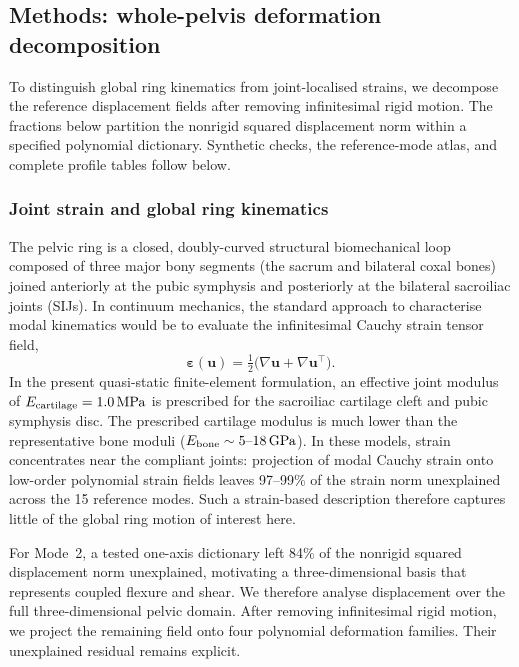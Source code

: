 \documentclass[pdflatex,sn-basic]{sn-jnl}
\begin{document}
\subsection{Methods: whole-pelvis deformation decomposition}\label{sec:mechanisms-methods}
To distinguish global ring kinematics from joint-localised strains, we decompose the reference displacement fields after removing infinitesimal rigid motion. The fractions below partition the nonrigid squared displacement norm within a specified polynomial dictionary. Synthetic checks, the reference-mode atlas, and complete profile tables follow below.

\subsubsection{Joint strain and global ring kinematics}
The pelvic ring is a closed, doubly-curved structural biomechanical loop composed of three major bony segments (the sacrum and bilateral coxal bones) joined anteriorly at the pubic symphysis and posteriorly at the bilateral sacroiliac joints (SIJs).
In continuum mechanics, the standard approach to characterise modal kinematics would be to evaluate the infinitesimal Cauchy strain tensor field,
\begin{equation}
\boldsymbol\varepsilon(\mathbf u) = \tfrac{1}{2}\big(\nabla \mathbf u + \nabla \mathbf u^\top\big).
\label{eq:cauchy-strain}
\end{equation}
In the present quasi-static finite-element formulation, an effective joint modulus of $E_{\rm cartilage} = 1.0\,\mathrm{MPa}$ is prescribed for the sacroiliac cartilage cleft and pubic symphysis disc.
The prescribed cartilage modulus is much lower than the representative bone moduli ($E_{\rm bone} \sim 5\text{--}18\,\mathrm{GPa}$). In these models, strain concentrates near the compliant joints: projection of modal Cauchy strain onto low-order polynomial strain fields leaves 97--99\% of the strain norm unexplained across the 15 reference modes. Such a strain-based description therefore captures little of the global ring motion of interest here.

For Mode~2, a tested one-axis dictionary left 84\% of the nonrigid squared displacement norm unexplained, motivating a three-dimensional basis that represents coupled flexure and shear.
We therefore analyse displacement over the full three-dimensional pelvic domain. After removing infinitesimal rigid motion, we project the remaining field onto four polynomial deformation families. Their unexplained residual remains explicit.
\end{document}
